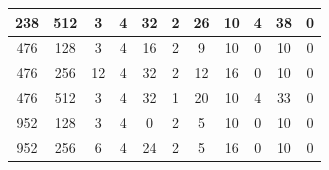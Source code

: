 \begin{table}[h]
\begin{tabular}{|c|c|ccc|cc|cccc|}
238                                                                               & 512                                                                     & \multicolumn{1}{c|}{3}           & \multicolumn{1}{c|}{4}                  & 32                & \multicolumn{1}{c|}{2}                                 & 26                                & \multicolumn{1}{c|}{10}  & \multicolumn{1}{c|}{4}   & \multicolumn{1}{c|}{38}  & 0   \\ \hline
476                                                                               & 128                                                                     & \multicolumn{1}{c|}{3}           & \multicolumn{1}{c|}{4}                  & 16                & \multicolumn{1}{c|}{2}                                 & 9                                 & \multicolumn{1}{c|}{10}  & \multicolumn{1}{c|}{0}   & \multicolumn{1}{c|}{10}  & 0   \\ \hline
476                                                                               & 256                                                                     & \multicolumn{1}{c|}{12}          & \multicolumn{1}{c|}{4}                  & 32                & \multicolumn{1}{c|}{2}                                 & 12                                & \multicolumn{1}{c|}{16}  & \multicolumn{1}{c|}{0}   & \multicolumn{1}{c|}{10}  & 0   \\ \hline
476                                                                               & 512                                                                     & \multicolumn{1}{c|}{3}           & \multicolumn{1}{c|}{4}                  & 32                & \multicolumn{1}{c|}{1}                                 & 20                                & \multicolumn{1}{c|}{10}  & \multicolumn{1}{c|}{4}   & \multicolumn{1}{c|}{33}  & 0   \\ \hline
952                                                                               & 128                                                                     & \multicolumn{1}{c|}{3}           & \multicolumn{1}{c|}{4}                  & 0                 & \multicolumn{1}{c|}{2}                                 & 5                                 & \multicolumn{1}{c|}{10}  & \multicolumn{1}{c|}{0}   & \multicolumn{1}{c|}{10}  & 0   \\ \hline
952                                                                               & 256                                                                     & \multicolumn{1}{c|}{6}           & \multicolumn{1}{c|}{4}                  & 24                & \multicolumn{1}{c|}{2}                                 & 5                                 & \multicolumn{1}{c|}{16}  & \multicolumn{1}{c|}{0}   & \multicolumn{1}{c|}{10}  & 0   \\ \hline

\end{tabular}
\end{table}
